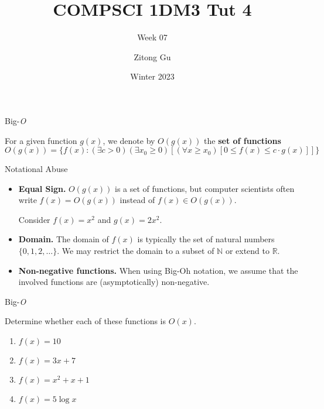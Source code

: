 \documentclass{beamer}
\title{COMPSCI 1DM3 Tut 4}
\subtitle{Week 07}
\author{Zitong Gu}
\institute{McMaster University}
\date{Winter 2023}
\begin{document}
\frame{\titlepage}

\begin{frame}{Big-\textit{O}}
    \begin{definition}
        For a given function $g(x)$, we denote by $O(g(x))$ the \textbf{set of functions}
        $$
            O(g(x)) = \{ f(x): (\exists c > 0)(\exists x_0 \geq 0)[(\forall x \geq x_0)[0 \leq f(x) \leq c \cdot g(x)]] \}
        $$
    \end{definition}
\end{frame}

\begin{frame}{Notational Abuse}
    \begin{itemize}
        \item \textbf{Equal Sign.} $O(g(x))$ is a set of functions, but computer scientists often write $f(x) = O(g(x))$ instead of $f(x) \in O(g(x))$.
        \begin{example}
            Consider $f(x) = x^2$ and $g(x) = 2x^2$. \vspace{12mm}
        \end{example}
        \item \textbf{Domain.} The domain of $f(x)$ is typically the set of natural numbers $\{0, 1, 2, \dots\}$. We may restrict the domain to a subset of $\mathbb{N}$ or extend to $\mathbb{R}$. 
        \item \textbf{Non-negative functions.} When using Big-Oh notation, we assume that the involved functions are (asymptotically) non-negative. 
    \end{itemize}
\end{frame}

\begin{frame}[t]{Big-\textit{O}}
    \begin{example}
        Determine whether each of these functions is $\textit{O}(x)$.
        \begin{enumerate}
            \item $f(x) = 10$
            \vspace{10mm}
            \item $f(x) = 3x + 7$
            \vspace{10mm}
            \item $f(x) = x^2 + x + 1$
            \vspace{10mm}
            \item $f(x) = 5 \log{x}$
            \vspace{10mm}
        \end{enumerate}
    \end{example}
\end{frame}
\end{document}
